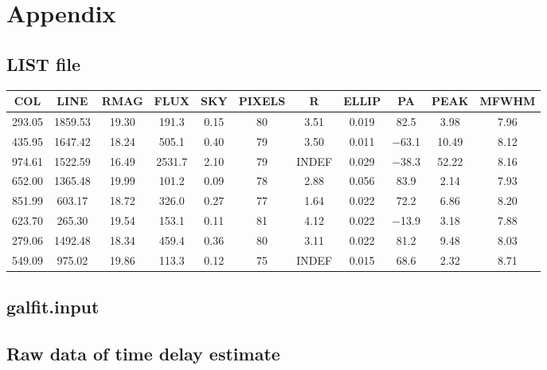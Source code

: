 \appendix
\chapter{Appendix}
\section{LIST file}\label{app:LIST}
\begin{tabular}{ccccccccccc}
   \toprule
COL & LINE & RMAG & FLUX & SKY & PIXELS & R & ELLIP & PA & PEAK & MFWHM\\
\midrule
\num{293.05} & \num{1859.53} & \num{19.30} & \num{191.3} & \num{0.15} & \num{80} & \num{3.51} & \num{0.019} & \num{82.5} & \num{3.98} & \num{7.96}\\
\num{435.95} & \num{1647.42} & \num{18.24} & \num{505.1} & \num{0.40} & \num{79} & \num{3.50} & \num{0.011} & \num{-63.1} & \num{10.49} & \num{8.12}\\
\num{974.61} & \num{1522.59} & \num{16.49} & \num{2531.7} & \num{2.10} & \num{79} & INDEF & \num{0.029} & \num{-38.3} & \num{52.22} & \num{8.16}\\
\num{652.00} & \num{1365.48} & \num{19.99} & \num{101.2} & \num{0.09} & \num{78} & \num{2.88} & \num{0.056} & \num{83.9} & \num{2.14} & \num{7.93}\\
\num{851.99} & \num{603.17} & \num{18.72} & \num{326.0} & \num{0.27} & \num{77} & \num{1.64} & \num{0.022} & \num{72.2} & \num{6.86} & \num{8.20}\\
\num{623.70} & \num{265.30} & \num{19.54} & \num{153.1} & \num{0.11} & \num{81} & \num{4.12} & \num{0.022} & \num{-13.9} & \num{3.18} & \num{7.88}\\
\num{279.06} & \num{1492.48} & \num{18.34} & \num{459.4} & \num{0.36} & \num{80} & \num{3.11} & \num{0.022} & \num{81.2} & \num{9.48} & \num{8.03}\\
\num{549.09} & \num{975.02} & \num{19.86} & \num{113.3} & \num{0.12} & \num{75} & INDEF & \num{0.015} & \num{68.6} & \num{2.32} & \num{8.71}\\
\bottomrule
\end{tabular}

\clearpage
\section{galfit.input}\label{app:galfit}


\clearpage
\section{Raw data of time delay estimate}\label{app:timdel}


